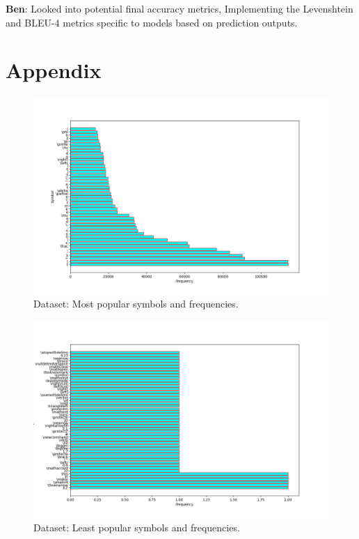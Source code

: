\documentclass{article}
\begin{document}
\textbf{Ben}: Looked into potential final accuracy metrics, Implementing the Levenshtein and BLEU-4 metrics specific to models based on  prediction outputs.

\medskip

\nocite{*}


\section{Appendix}

\begin{figure}[H]
    \centering
    \includegraphics[scale=0.4]{fig_vocabs_frequency_1.png}
    \caption{Dataset: Most popular symbols and frequencies.}
    \label{fig:vocab_freq_1}
\end{figure}

\begin{figure}[H]
    \centering
    \includegraphics[scale=0.4]{fig_vocabs_frequency_2.png}
    \caption{Dataset: Least popular symbols and frequencies.}
    \label{fig:vocab_freq_2}
\end{figure}
\end{document}
